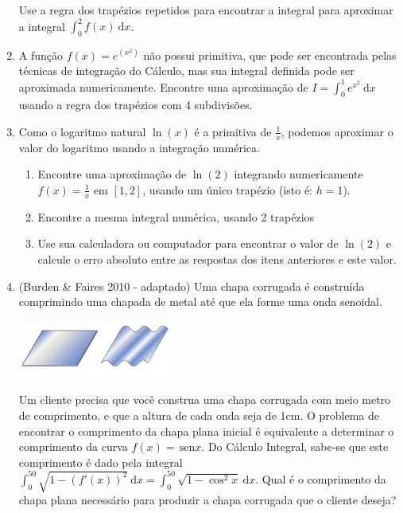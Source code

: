 \documentclass[a4paper]{article}
\providecommand{\sin}{} \renewcommand{\sin}{\hspace{2pt}\mathrm{sen}}
\newcommand{\ud}{\mathrm{\ d}}
\begin{document}
\begin{enumerate}
  Use a regra dos trapézios repetidos para encontrar a integral para
  aproximar a integral $\int_0^2f(x) \ud x$.


\item A função $f(x) = e^{(x^2)}$ não possui primitiva, que pode ser
  encontrada pelas técnicas de integração do Cálculo, mas sua integral
  definida pode ser aproximada numericamente. Encontre uma aproximação
  de $I=\int_0^1e^{x^2} \ud x$ usando a regra dos trapézios com 4
  subdivisões.


\item Como o logaritmo natural $\ln (x)$ é a primitiva de
  $\frac{1}{x}$, podemos aproximar o valor do logaritmo usando a
  integração numérica.
  \begin{enumerate}
  \item Encontre uma aproximação de $\ln (2)$ integrando numericamente
    $f(x)=\frac{1}{x}$ em $[1,2]$, usando um único trapézio (isto é:
    $h=1$).


  \item Encontre a mesma integral numérica, usando 2 trapézios


  \item Use sua calculadora ou computador para encontrar o valor de
    $\ln (2)$ e calcule o erro absoluto entre as respostas dos itens
    anteriores e este valor.
  \end{enumerate}

\item (Burden \& Faires 2010 - adaptado) Uma chapa corrugada é
  construída comprimindo uma chapada de metal até que ela forme uma
  onda senoidal.

  \begin{center}
    \includegraphics[width=0.4\textwidth]{corrugada}
  \end{center}

  Um cliente precisa que você construa uma chapa corrugada com meio
  metro de comprimento, e que a altura de cada onda seja de 1cm. O
  problema de encontrar o comprimento da chapa plana inicial é
  equivalente a determinar o comprimento da curva $f(x)=\sin x$. Do
  Cálculo Integral, sabe-se que este comprimento é dado pela integral
  $\int_0^{50}\sqrt{1-(f'(x))^2}\ud x = \int_0^{50}\sqrt{1-\cos^2 x}
  \ud x$. Qual é o comprimento da chapa plana necessário para produzir
  a chapa corrugada que o cliente deseja?


\end{enumerate}
\end{document}
